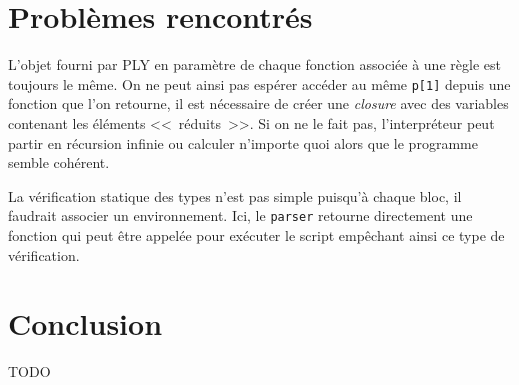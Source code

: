 \documentclass[12pt,twocolumn]{article}
\begin{document}
\section{Problèmes rencontrés}
L'objet fourni par PLY en paramètre de chaque fonction
associée à une règle est toujours le même. On ne peut ainsi
pas espérer accéder au même \texttt{p[1]} depuis une fonction
que l'on retourne, il est nécessaire de créer une \textit{closure}
avec des variables contenant les éléments <<~réduits~>>.
Si on ne le fait pas, l'interpréteur peut partir en récursion infinie
ou calculer n'importe quoi alors que le programme semble cohérent.

La vérification statique des types n'est pas simple puisqu'à chaque bloc,
il faudrait associer un environnement. Ici, le \texttt{parser} retourne
directement une fonction qui peut être appelée pour exécuter le script
empêchant ainsi ce type de vérification.


\section{Conclusion}
TODO


%
\end{document}
